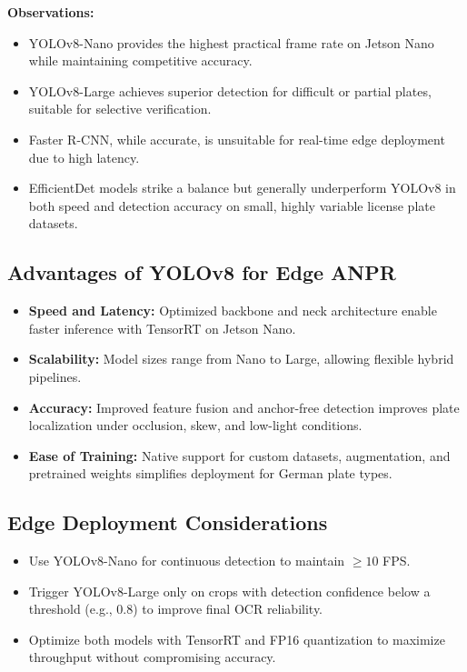 	\textbf{Observations:}
	\begin{itemize}
		\item YOLOv8-Nano provides the highest practical frame rate on Jetson Nano while maintaining competitive accuracy.
		\item YOLOv8-Large achieves superior detection for difficult or partial plates, suitable for selective verification.
		\item Faster R-CNN, while accurate, is unsuitable for real-time edge deployment due to high latency.
		\item EfficientDet models strike a balance but generally underperform YOLOv8 in both speed and detection accuracy on small, highly variable license plate datasets.
	\end{itemize}
	
	\subsection{Advantages of YOLOv8 for Edge ANPR}
	
	\begin{itemize}
		\item \textbf{Speed and Latency:} Optimized backbone and neck architecture enable faster inference with TensorRT on Jetson Nano.
		\item \textbf{Scalability:} Model sizes range from Nano to Large, allowing flexible hybrid pipelines.
		\item \textbf{Accuracy:} Improved feature fusion and anchor-free detection improves plate localization under occlusion, skew, and low-light conditions.
		\item \textbf{Ease of Training:} Native support for custom datasets, augmentation, and pretrained weights simplifies deployment for German plate types.
	\end{itemize}
	
	\subsection{Edge Deployment Considerations}
	
	\begin{itemize}
		\item Use YOLOv8-Nano for continuous detection to maintain $\geq 10$ FPS.
		\item Trigger YOLOv8-Large only on crops with detection confidence below a threshold (e.g., 0.8) to improve final OCR reliability.
		\item Optimize both models with TensorRT and FP16 quantization to maximize throughput without compromising accuracy.
	\end{itemize}
	

